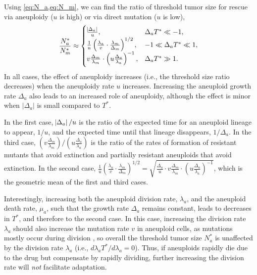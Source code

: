 \documentclass[12pt]{extarticle}
\begin{document}
Using \cref{eq:N_a,eq:N_m}, we can find the ratio of threshold tumor size for rescue via aneuploidy ($u$ is high) or via direct mutation ($u$ is low),
\begin{equation} \label{eq:N_ratio}
\frac{N^*_a}{N^*_m} \approx \begin{cases}
    \frac{\abs{\Delta_a}}{u} ,&
  \Delta_a T^* \ll -1 ,\\ 
  \frac{1}{u}\left(\frac{\lambda_a}{v} \cdot \frac{\lambda_m}{\Delta_m}\right)^{1/2} ,&
  -1 \ll \Delta_a T^* \ll 1  ,\\ 
  v \frac{\Delta_m}{\lambda_m} \cdot \left(u \frac{\Delta_a}{\lambda_a}\right)^{-1}  ,&
   \Delta_a T^* \gg 1 .
  \end{cases}
\end{equation}
In all cases, the effect of aneuploidy increases (i.e., the threshold size ratio decreases) when the aneuploidy rate $u$ increases. Increasing the aneuploid growth rate $\Delta_a$ also leads to an increased role of aneuploidy, although the effect is minor when $|\Delta_a|$ is small compared to $T^*$.

In the first case, $\abs{\Delta_a}/u$ is  the ratio of the expected time for an aneuploid lineage to appear, $1/u$, and the expected time until that lineage disappears, $1/\Delta_a$.
In the third case, $\left(v \frac{\Delta_m}{\lambda_m}\right) / \left(u \frac{\Delta_a}{\lambda_a}\right)$ is the ratio of the rates of formation of resistant mutants that avoid extinction and partially resistant aneuploids that avoid extinction.
In the second case, $\frac{1}{u}\left(\frac{\lambda_a}{v} \cdot \frac{\lambda_m}{\Delta_m}\right)^{1/2}=\sqrt{\frac{\Delta_a}{u} \cdot v \frac{\Delta_m}{\lambda_m} \cdot \left(u\frac{\Delta_a}{\lambda_a}\right)^{-1}}$, which is the geometric mean of the first and third cases.

Interestingly, increasing both the aneuploid division rate, $\lambda_a$, and the aneuploid death rate, $\mu_a$, such that the growth rate $\Delta_a$ remains constant, leads to decreases in $T^*$, and therefore to the second case. In this case, increasing the division rate $\lambda_a$ should also increase the mutation rate $v$ in aneuploid cells, as mutations mostly occur during division , so overall the threshold tumor size $N_a^*$ is unaffected by the division rate $\lambda_a$ (i.e., $d \lambda_a T^*/d\lambda_a = 0$). Thus, if aneuploids rapidly die due to the drug but compensate by rapidly dividing, further increasing  the division rate will \emph{not} facilitate adaptation.
\end{document}
